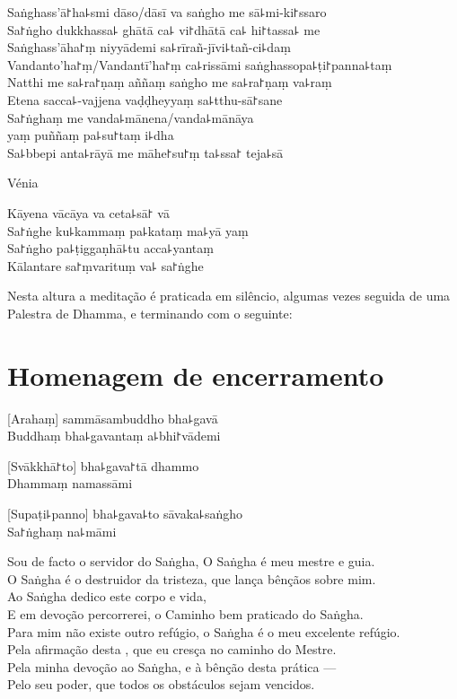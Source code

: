 \enlargethispage{\baselineskip}
\clearpage

Saṅghass'ā꜓ha꜕smi dāso/dāsī va saṅgho me sā꜕mi-ki꜓ssaro\\
Sa꜓ṅgho dukkhassa꜕ ghātā ca꜕ vi꜓dhātā ca꜕ hi꜓tassa꜕ me\\
Saṅghass'āha꜓ṃ niyyādemi sa꜕rīrañ-jīvi꜕tañ-ci꜕daṃ\\
Vandanto'ha꜓ṃ/Vandantī'ha꜓ṃ ca꜕rissāmi saṅghassopa꜕ṭi꜓panna꜕taṃ\\
Natthi me sa꜕ra꜓ṇaṃ aññaṃ saṅgho me sa꜕ra꜓ṇaṃ va꜕raṃ\\
Etena sacca꜕-vajjena vaḍḍheyyaṃ sa꜕tthu-sā꜓sane\\
Sa꜓ṅghaṃ me vanda꜕mānena/vanda꜕mānāya\\
\vin yaṃ puññaṃ pa꜕su꜓taṃ i꜕dha\\
Sa꜕bbepi anta꜕rāyā me māhe꜓su꜓ṃ ta꜕ssa꜓ teja꜕sā

\begin{instruction}
  Vénia
\end{instruction}

Kāyena vācāya va ceta꜕sā꜓ vā\\
Sa꜓ṅghe ku꜕kammaṃ pa꜕kataṃ ma꜕yā yaṃ\\
Sa꜓ṅgho pa꜕ṭiggaṇhā꜕tu acca꜕yantaṃ\\
Kālantare sa꜓ṃvarituṃ va꜕ sa꜓ṅghe

\vfill

\begin{instruction}
  Nesta altura a meditação é praticada em silêncio, algumas vezes seguida de uma Palestra de Dhamma, e terminando com o seguinte:
\end{instruction}

\chapter*{Homenagem de encerramento}

\delegateSetUseNext

[Arahaṃ] sammāsambuddho bha꜕gavā\\
Buddhaṃ bha꜕gavantaṃ a꜕bhi꜓vādemi 

[Svākkhā꜓to] bha꜕gava꜓tā dhammo\\
Dhammaṃ namassāmi 

[Supaṭi꜕panno] bha꜕gava꜕to sāvaka꜕saṅgho\\
Sa꜓ṅghaṃ na꜕māmi 

\clearpage

Sou de facto o servidor do Saṅgha, O Saṅgha é meu mestre e guia.\\
O Saṅgha é o destruidor da tristeza, que lança bênçãos sobre mim.\\
Ao Saṅgha dedico este corpo e vida,\\
E em devoção percorrerei, o Caminho bem praticado do Saṅgha.\\
Para mim não existe outro refúgio, o Saṅgha é o meu excelente refúgio.\\
Pela afirmação desta , que eu cresça no caminho do Mestre.\\
Pela minha devoção ao Saṅgha, e à bênção desta prática ---\\
Pelo seu poder, que todos os obstáculos sejam vencidos.

